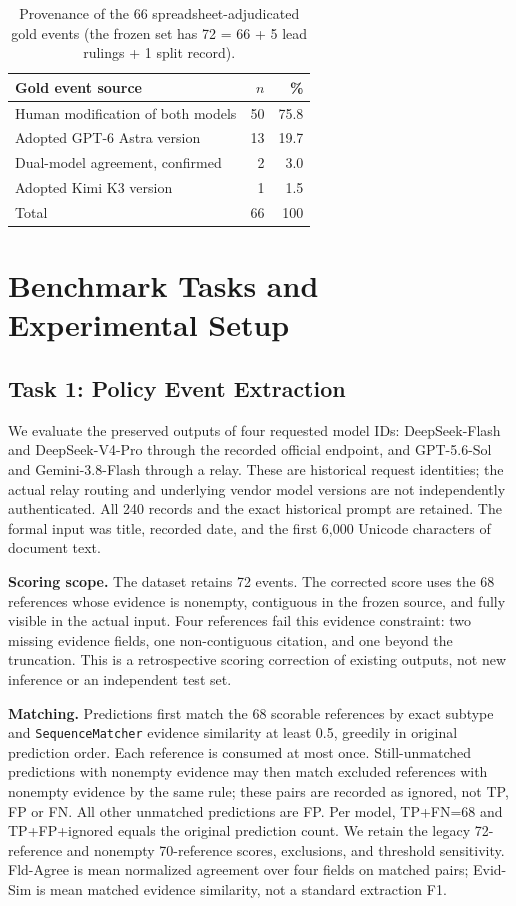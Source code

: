 \documentclass[sigconf,anonymous,review]{acmart}
\begin{document}
\begin{table}[t]
  \centering
  \caption{Provenance of the 66 spreadsheet-adjudicated gold events
    (the frozen set has 72 = 66 + 5 lead rulings + 1 split record).}
  \label{tab:goldsource}
  \begin{tabular}{lrr}
    \toprule
    Gold event source & $n$ & \% \\
    \midrule
    Human modification of both models & 50 & 75.8 \\
    Adopted GPT-6 Astra version & 13 & 19.7 \\
    Dual-model agreement, confirmed & 2 & 3.0 \\
    Adopted Kimi K3 version & 1 & 1.5 \\
    \midrule
    Total & 66 & 100 \\
    \bottomrule
  \end{tabular}
\end{table}

\section{Benchmark Tasks and Experimental Setup}

\subsection{Task 1: Policy Event Extraction}
We evaluate the preserved outputs of four requested model IDs: DeepSeek-Flash and DeepSeek-V4-Pro through the recorded official endpoint, and GPT-5.6-Sol and Gemini-3.8-Flash through a relay. These are historical request identities; the actual relay routing and underlying vendor model versions are not independently authenticated. All 240 records and the exact historical prompt are retained. The formal input was title, recorded date, and the first 6,000 Unicode characters of document text.

\textbf{Scoring scope.} The dataset retains 72 events. The corrected score uses the 68 references whose evidence is nonempty, contiguous in the frozen source, and fully visible in the actual input. Four references fail this evidence constraint: two missing evidence fields, one non-contiguous citation, and one beyond the truncation. This is a retrospective scoring correction of existing outputs, not new inference or an independent test set.

\textbf{Matching.} Predictions first match the 68 scorable references by exact subtype and \texttt{SequenceMatcher} evidence similarity at least 0.5, greedily in original prediction order. Each reference is consumed at most once. Still-unmatched predictions with nonempty evidence may then match excluded references with nonempty evidence by the same rule; these pairs are recorded as ignored, not TP, FP or FN. All other unmatched predictions are FP. Per model, TP+FN=68 and TP+FP+ignored equals the original prediction count. We retain the legacy 72-reference and nonempty 70-reference scores, exclusions, and threshold sensitivity. Fld-Agree is mean normalized agreement over four fields on matched pairs; Evid-Sim is mean matched evidence similarity, not a standard extraction F1.
\end{document}
